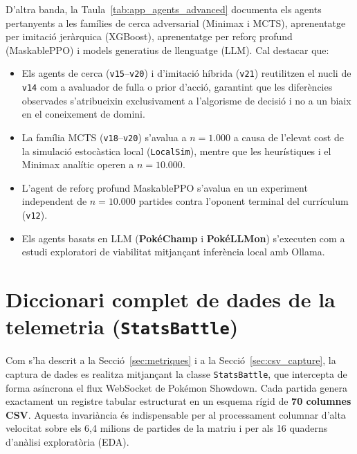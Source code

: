 D'altra banda, la Taula~\ref{tab:app_agents_advanced} documenta els agents pertanyents a les famílies de cerca adversarial (Minimax i MCTS), aprenentatge per imitació jeràrquica (XGBoost), aprenentatge per reforç profund (MaskablePPO) i models generatius de llenguatge (LLM). Cal destacar que:
\begin{itemize}
    \item Els agents de cerca (\texttt{v15}--\texttt{v20}) i d'imitació híbrida (\texttt{v21}) reutilitzen el nucli de \texttt{v14} com a avaluador de fulla o prior d'acció, garantint que les diferències observades s'atribueixin exclusivament a l'algorisme de decisió i no a un biaix en el coneixement de domini.
    \item La família MCTS (\texttt{v18}--\texttt{v20}) s'avalua a $n=1.000$ a causa de l'elevat cost de la simulació estocàstica local (\texttt{LocalSim}), mentre que les heurístiques i el Minimax analític operen a $n=10.000$.
    \item L'agent de reforç profund MaskablePPO s'avalua en un experiment independent de $n=10.000$ partides contra l'oponent terminal del currículum (\texttt{v12}).
    \item Els agents basats en LLM (\textbf{PokéChamp} i \textbf{PokéLLMon}) s'executen com a estudi exploratori de viabilitat mitjançant inferència local amb Ollama.
\end{itemize}



\section{Diccionari complet de dades de la telemetria (\texttt{StatsBattle})}
\label{sec:app_data_dictionary}

Com s'ha descrit a la Secció~\ref{sec:metriques} i a la Secció~\ref{sec:csv_capture}, la captura de dades es realitza mitjançant la classe \texttt{StatsBattle}, que intercepta de forma asíncrona el flux WebSocket de Pokémon Showdown. Cada partida genera exactament un registre tabular estructurat en un esquema rígid de \textbf{70 columnes CSV}. Aquesta invariància és indispensable per al processament columnar d'alta velocitat sobre els 6,4 milions de partides de la matriu i per als 16 quaderns d'anàlisi exploratòria (EDA).


